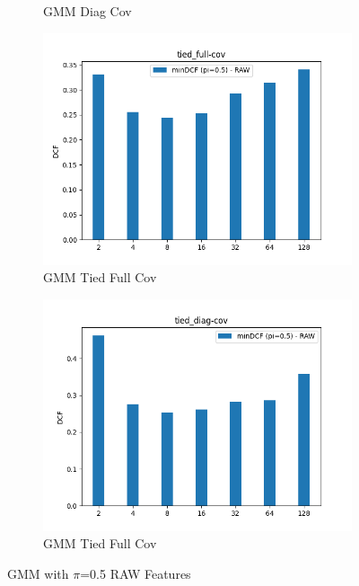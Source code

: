 \documentclass[english]{report}
\begin{document}
\begin{figure}[h!]
\begin{subfigure}{0.3\textwidth}
        \caption{GMM Diag Cov}
    \end{subfigure}
    \begin{subfigure}{0.3\textwidth}
        \includegraphics[scale=0.3]{../../images/validation/GMM_tied-full-cov_component_comparison.png}
        \caption{GMM Tied Full Cov}
    \end{subfigure}
    \begin{subfigure}{0.3\textwidth}
        \includegraphics[scale=0.3]{../../images/validation/GMM_tied-diag-cov_component_comparison.png}
        \caption{GMM Tied Full Cov}
    \end{subfigure}
    \centering
    \caption{GMM with $\pi$=0.5 RAW Features}
    \label{fig:GMM}
\end{figure}
\end{document}
